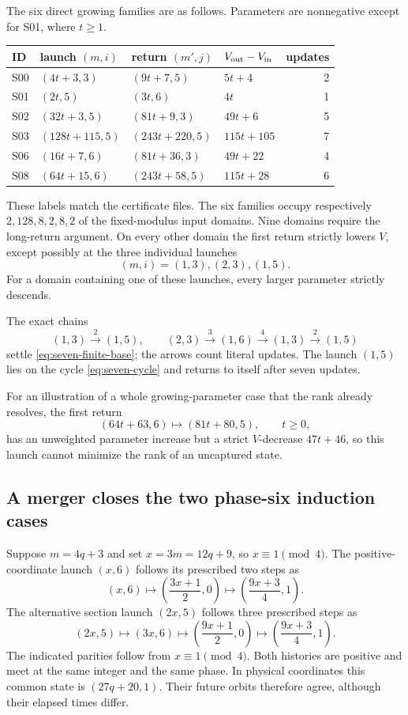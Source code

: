 The six direct growing families are as follows.  Parameters are
nonnegative except for S01, where $t\ge1$.
\begin{center}
\begin{tabular}{llllr}
\hline
ID&launch $(m,i)$&return $(m',j)$&$V_{\rm out}-V_{\rm in}$&updates\\ \hline
S00&$(4t+3,3)$&$(9t+7,5)$&$5t+4$&2\\
S01&$(2t,5)$&$(3t,6)$&$4t$&1\\
S02&$(32t+3,5)$&$(81t+9,3)$&$49t+6$&5\\
S03&$(128t+115,5)$&$(243t+220,5)$&$115t+105$&7\\
S06&$(16t+7,6)$&$(81t+36,3)$&$49t+22$&4\\
S08&$(64t+15,6)$&$(243t+58,5)$&$115t+28$&6\\ \hline
\end{tabular}
\end{center}
These labels match the certificate files. The six families occupy
respectively $2,128,8,2,8,2$ of the fixed-modulus input domains.
Nine domains require the long-return argument.  On every other domain
the first return strictly lowers $V$, except possibly at the three
individual launches
\begin{equation}
 (m,i)=(1,3),(2,3),(1,5).
 \label{eq:seven-finite-base}
\end{equation}
For a domain containing one of these launches, every larger parameter
strictly descends.

The exact chains
\[
 (1,3)\xrightarrow{2}(1,5),\qquad
 (2,3)\xrightarrow{3}(1,6)\xrightarrow{4}(1,3)
               \xrightarrow{2}(1,5)
\]
settle \eqref{eq:seven-finite-base}; the arrows count literal updates.
The launch $(1,5)$ lies on the cycle \eqref{eq:seven-cycle} and
returns to itself after seven updates.

For an illustration of a whole growing-parameter case that the rank
already resolves, the first return
\[
 (64t+63,6)\longmapsto(81t+80,5),\qquad t\ge0,
\]
has an unweighted parameter increase but a strict $V$-decrease
$47t+46$, so this launch cannot minimize the rank of an uncaptured state.

\subsection{A merger closes the two phase-six induction cases}

Suppose $m=4q+3$ and set $x=3m=12q+9$, so $x\equiv1\pmod4$.
The positive-coordinate launch $(x,6)$ follows its prescribed two
steps as
\[
 (x,6)\longmapsto\left(\frac{3x+1}{2},0\right)
       \longmapsto\left(\frac{9x+3}{4},1\right).
\]
The alternative section launch $(2x,5)$ follows three prescribed
steps as
\[
 (2x,5)\longmapsto(3x,6)
       \longmapsto\left(\frac{9x+1}{2},0\right)
       \longmapsto\left(\frac{9x+3}{4},1\right).
\]
The indicated parities follow from $x\equiv1\pmod4$.  Both histories
are positive and meet at the same integer and the same phase.  In
physical coordinates this common state is $(27q+20,1)$.  Their future
orbits therefore agree, although their elapsed times differ.

